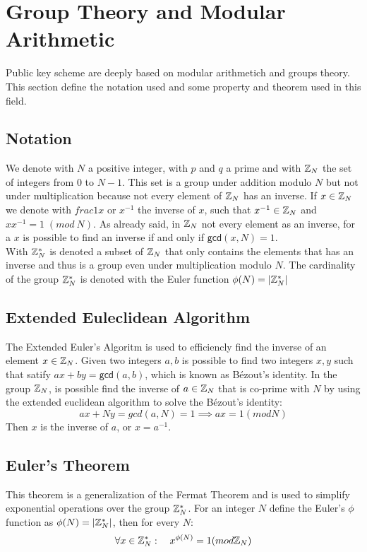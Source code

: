 \section{Group Theory and Modular Arithmetic}
Public key scheme are deeply based on modular arithmetich and groups theory. This section define the notation used and some property and theorem used in this field.
\subsection{Notation}
We denote with $N$ a positive integer, with $p$ and $q$ a prime and with $\mathbb{Z}_N$ the set of integers from $0$ to $N-1$. This set is a group under addition modulo $N$ but not under multiplication because not every element of $\mathbb{Z}_N$ has an inverse. If $x \in \mathbb{Z}_N$ we denote with $frac{1}{x}$ or $x^{-1}$ the inverse of $x$, such that $x^{-1} \in \mathbb{Z}_N$ and $xx^{-1} = 1 \; (mod \: N)$. As already said, in $\mathbb{Z}_N$ not every element as an inverse, for a $x$ is possible to find an inverse if and only if $\mathsf{gcd}(x,N) = 1$.\\
With $\mathbb{Z}_N^{*}$ is denoted a subset of $\mathbb{Z}_N$ that only contains the elements that has an inverse and thus is a group even under multiplication modulo $N$. The cardinality of the group $\mathbb{Z}_N^{*}$ is denoted with the Euler function $\phi(N) = |\mathbb{Z}_N^{*}|$
\subsection{Extended Euleclidean Algorithm}
The Extended Euler's Algoritm is used to efficiencly find the inverse of an element $x \in \mathbb{Z}_N$. Given two integers $a, b$ is possible to find two integers $x, y$ such that satify $ax + by = \mathsf{gcd}(a, b)$, which is known as Bézout's identity.
In the group $\mathbb{Z}_N$, is possible find the inverse of $a \in \mathbb{Z}_N$ that is co-prime with $N$ by using the extended euclidean algorithm to solve the Bézout's identity:
$$
   ax+Ny = gcd(a, N) = 1 \implies ax = 1 (mod N)
$$
Then $x$ is the inverse of $a$, or $x = a^{-1}$.
\subsection{Euler's Theorem}
This theorem is a generalization of the Fermat Theorem and is used to simplify exponential operations over the group $\mathbb{Z}_N^{*}$. For an integer $N$ define the Euler's $\phi$ function as $\phi(N) = |\mathbb{Z}_N^{*}|$, then for every $N$:
$$\forall x \in \mathbb{Z}_N^{*}: \quad x^{\phi(N)} = 1 (mod \mathbb{Z}_N)$$

